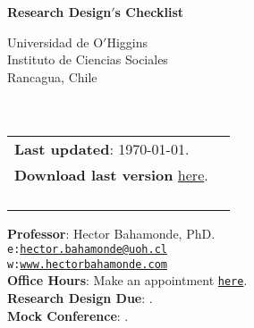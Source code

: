 \documentclass[letterpaper]{article}
\def\name{Research Design$'$s Checklist}
\begin{document}

\centerline{\huge \bf \name}

\vspace{0.25in}

\begin{minipage}{0.45\linewidth}
 Universidad de O$'$Higgins \\
  Instituto de Ciencias Sociales \\
  Rancagua, Chile\\
  \\
  \\

\end{minipage}
\hspace{4cm}\begin{minipage}{0.45\linewidth}
  \begin{tabular}{ll}
{\bf Last updated}: \today. \\
 {\bf Download last version} \href{https://github.com/hbahamonde/Social_Sciences_Epistemology_UGRAD/raw/master/Bahamonde_Social_Sciences_Epistemology_UGRAD_Syllabus.pdf}{here}.%
    \\
    \\
    \\
    \\
    \\
  \end{tabular}
\end{minipage}

\vspace{-5mm}
{\bf Professor}: Hector Bahamonde, PhD.\\
\texttt{e:}\href{mailto:hector.bahamonde@uoh.cl}{\texttt{hector.bahamonde@uoh.cl}}\\
\texttt{w:}\href{http://www.hectorbahamonde.com}{\texttt{www.hectorbahamonde.com}}\\
{\bf Office Hours}: Make an appointment \href{https://calendly.com/bahamonde/officehours}{\texttt{here}}.\\

\vspace{1mm}
{\bf Research Design Due}: {\unskip}.\\
{\bf Mock Conference}: {\unskip}.
\end{document}
